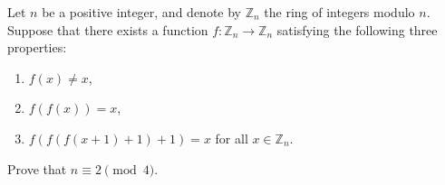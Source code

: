 \documentclass{article}
\begin{document}
\setlength{\parindent}{0pt}
Let $n$ be a positive integer, and denote by $\mathbb{Z}_n$ the ring of integers modulo $n$. Suppose that there exists a function $f:\mathbb{Z}_n\to\mathbb{Z}_n$ satisfying the following three properties:
\begin{enumerate}[label=(\roman*)]
\item $f(x)\neq x$,
\item $f(f(x))=x$,
\item $f(f(f(x+1)+1)+1)=x$ for all $x\in\mathbb{Z}_n$.
\end{enumerate}
Prove that $n\equiv 2 \pmod4$.
\end{document}
